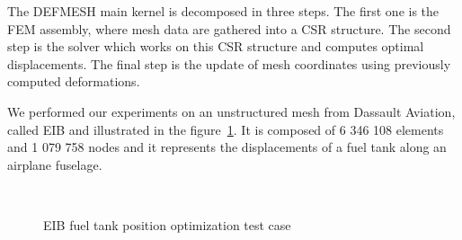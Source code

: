\documentclass[10pt]{IOS-Book-Article}
\begin{document}
The DEFMESH main kernel is decomposed in three steps.
The first one is the FEM assembly, where mesh data are gathered into a CSR structure.
The second step is the solver which works on this CSR structure and computes optimal displacements.
The final step is the update of mesh coordinates using previously computed deformations.

We performed our experiments on an unstructured mesh from Dassault Aviation, called EIB and illustrated in the figure~\ref{fig:reservoir}.
It is composed of 6 346 108 elements and 1 079 758 nodes and it represents the displacements of a fuel tank along an airplane fuselage.

\begin{figure}[htp]
 \\
 \caption{EIB fuel tank position optimization test case}
 \label{fig:reservoir}
\end{figure}
\end{document}
